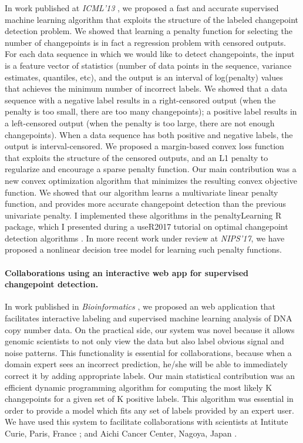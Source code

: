 \documentclass{article}
\begin{document}
In work published at \emph{ICML'13} \citep{HOCKING-penalties}, we
proposed a fast and accurate supervised machine learning algorithm
that exploits the structure of the labeled changepoint detection
problem. We showed that learning a penalty function for selecting the
number of changepoints is in fact a regression problem with censored
outputs. For each data sequence in which we would like to detect
changepoints, the input is a feature vector of statistics (number of
data points in the sequence, variance estimates, quantiles, etc), and
the output is an interval of log(penalty) values that achieves the
minimum number of incorrect labels. We showed that a data sequence
with a negative label results in a right-censored output (when the
penalty is too small, there are too many changepoints); a positive
label results in a left-censored output (when the penalty is too
large, there are not enough changepoints). When a data sequence has
both positive and negative labels, the output is interval-censored.
We proposed a margin-based convex loss function that exploits the
structure of the censored outputs, and an L1 penalty to regularize and
encourage a sparse penalty function. Our main contribution was a new
convex optimization algorithm that minimizes the resulting convex
objective function. We showed that our algorithm learns a multivariate
linear penalty function, and provides more accurate changepoint
detection than the previous univariate penalty. I implemented these
algorithms in the penaltyLearning R package, which I presented during
a useR2017 tutorial on optimal changepoint detection algorithms
\citep{change-tutorial}. In more recent work under review at
\emph{NIPS'17}, we have proposed a nonlinear decision tree model for
learning such penalty functions. 

\paragraph{Collaborations using an interactive web app for supervised
  changepoint detection.} In work published in \emph{Bioinformatics}
\citep{hocking-SegAnnDB}, we proposed an web application that
facilitates interactive labeling and supervised machine learning
analysis of DNA copy number data. On the practical side, our system
was novel because it allows genomic scientists to not only view the
data but also label obvious signal and noise patterns. This
functionality is essential for collaborations, because when a domain
expert sees an incorrect prediction, he/she will be able to
immediately correct it by adding appropriate labels. Our main
statistical contribution was an efficient dynamic programming
algorithm for computing the most likely K changepoints for a given set
of K positive labels. This algorithm was essential in order to provide a model
which fits any set of labels provided by an expert user. We have used
this system to facilitate collaborations with scientists at Intitute
Curie, Paris, France \citep{Chicard}; and Aichi Cancer Center, Nagoya,
Japan \citep{Hocking-Leukemia-2016,m14:clonal}.
\end{document}
